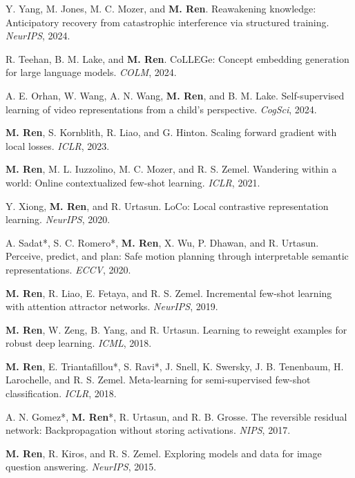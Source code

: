\begin{list2}
\item
Y. Yang, M. Jones, M. C. Mozer, and \textbf{M. Ren}.
Reawakening knowledge: Anticipatory recovery from catastrophic interference via structured training.
\textit{NeurIPS}, 2024.

\item
R. Teehan, B. M. Lake, and \textbf{M. Ren}.
CoLLEGe: Concept embedding generation for large language models.
\textit{COLM}, 2024.

\item
A. E. Orhan, W. Wang, A. N. Wang, \textbf{M. Ren}, and B. M. Lake.
Self-supervised learning of video representations from a child’s perspective.
\textit{CogSci}, 2024.

\item
\textbf{M. Ren}, S. Kornblith, R. Liao, and G. Hinton.
Scaling forward gradient with local losses.
\textit{ICLR}, 2023.

\item
\textbf{M. Ren}, M. L. Iuzzolino, M. C. Mozer, and R. S. Zemel.
Wandering within a world: Online contextualized few-shot learning.
\textit{ICLR}, 2021.

\item
Y. Xiong, \textbf{M. Ren}, and R. Urtasun.
LoCo: Local contrastive representation learning.
\textit{NeurIPS}, 2020.

\item
A. Sadat*, S. C. Romero*, \textbf{M. Ren}, X. Wu, P. Dhawan, and R. Urtasun.
Perceive, predict, and plan: Safe motion planning through interpretable semantic representations.
\textit{ECCV}, 2020.

\item
\textbf{M. Ren}, R. Liao, E. Fetaya, and R. S. Zemel.
Incremental few-shot learning with attention attractor networks.
\textit{NeurIPS}, 2019.

\item
\textbf{M. Ren}, W. Zeng, B. Yang, and R. Urtasun.
Learning to reweight examples for robust deep learning.
\textit{ICML}, 2018.

\item
\textbf{M. Ren}, E. Triantafillou*, S. Ravi*, J. Snell, K. Swersky, J. B. Tenenbaum, H. Larochelle, and R. S. Zemel.
Meta-learning for semi-supervised few-shot classification.
\textit{ICLR}, 2018.

\item
A. N. Gomez*, \textbf{M. Ren}*, R. Urtasun, and R. B. Grosse.
The reversible residual network: Backpropagation without storing activations.
\textit{NIPS}, 2017.

\item
\textbf{M. Ren}, R. Kiros, and R. S. Zemel.
Exploring models and data for image question answering.
\textit{NeurIPS}, 2015.

\end{list2}
